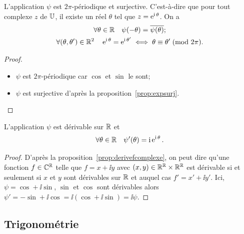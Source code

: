 \begin{prop}
    L'application \(\psi\) est  \(2\pi\)-périodique et surjective. C'est-à-dire 
    que pour tout complexe \(z\) de \(\mathbb{U}\), il existe un réel \(\theta\) tel que 
    \(z=\operatorname{e}^{\operatorname{i} \theta}\). On a
    \begin{gather}
        \forall \theta \in \mathbb{R} \quad \psi(-\theta)=\overline{\psi(\theta)};\\
        \forall (\theta, \theta') \in \mathbb{R}^2 \quad 
        \operatorname{e}^{\operatorname{i} \theta}=\operatorname{e}^{\operatorname{i} \theta'} \iff \theta \equiv \theta'\!\pmod {2\pi}.
    \end{gather}
\end{prop}
\begin{proof}
    \begin{itemize}
        \item \(\psi\) est \(2\pi\)-périodique car \(\cos\) et \(\sin\) le sont;
        \item \(\psi\) est surjective d'après la proposition~\ref{prop:expsurj}.
    \end{itemize}
\end{proof}
\begin{prop}
    L'application \(\psi\) est dérivable sur \(\mathbb{R}\) et
    \begin{equation}
        \forall \theta \in \mathbb{R} \quad \psi'(\theta)=\operatorname{i} \operatorname{e}^{\operatorname{i} \theta}.
    \end{equation}
\end{prop}
\begin{proof}
    D'après la proposition~\ref{prop:derivefcomplexe}, on peut dire qu'une 
    fonction \(f \in \mathbb{C}^{\mathbb{R}}\) telle que \(f=x+\ii y\) avec \((x,y) \in \mathbb{R}^{\mathbb{R}} 
    \times \mathbb{R}^{\mathbb{R}}\) est dérivable si et seulement si \(x\) et \(y\) sont 
    dérivables sur \(\mathbb{R}\) et auquel cas \(f'=x' +\ii y'\). Ici, \(\psi=\cos +\ii 
    \sin\), \(\sin\) et \(\cos\) sont dérivables alors \(\psi'=-\sin + \ii 
    \cos=\ii (\cos +\ii \sin)=\ii \psi\).
\end{proof}
\subsection{Trigonométrie}
\label{subsec:complexestrigo}
